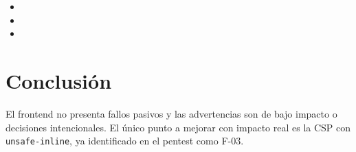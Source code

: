 \documentclass[11pt]{article}
\begin{document}
\begin{itemize}
  \item {}
  \item {}
  \item {}
\end{itemize}

\section{Conclusión}

El frontend no presenta fallos pasivos y las advertencias son de bajo impacto o
decisiones intencionales. El único punto a mejorar con impacto real es la CSP
con \texttt{unsafe-inline}, ya identificado en el pentest como F-03.
\end{document}

